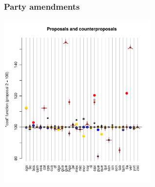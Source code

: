 \documentclass[xcolor=dvipsnames]{beamer}  %
\begin{document}
\begin{frame}                                       %

    \frametitle{Party amendments}
\begin{center}
   \includegraphics[width=8cm]{../../graphs/propsAndCost.pdf}
\end{center}
\end{frame}


\end{document}
